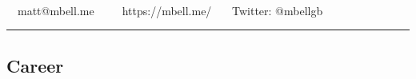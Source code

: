 \documentclass[11pt,a4paper]{article}
\begin{document}
\begin{center}
{\Huge {}}\\


\ \ matt@mbell.me\ \ \textbullet\
\ \ https://mbell.me/ \textbullet\
\ \ Twitter: @mbellgb
\end{center}


\hrule
\vspace{-1.2em}
\subsection*{Career}
\end{document}
